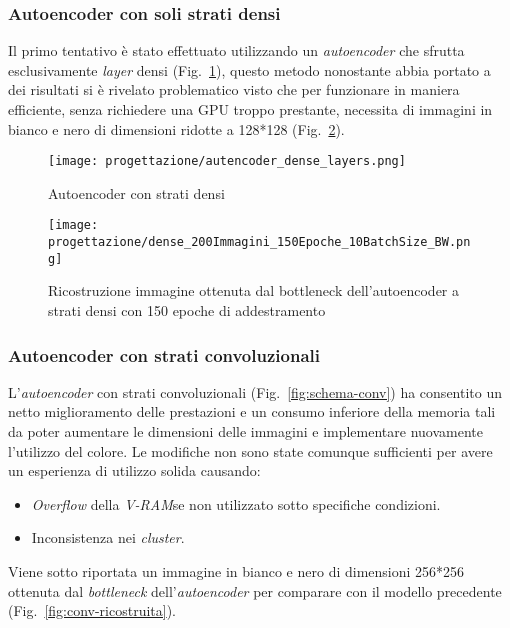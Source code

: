 \subsubsection{Autoencoder con soli strati densi}
Il primo tentativo è stato effettuato utilizzando un \emph{autoencoder} che sfrutta esclusivamente \emph{layer} densi (Fig.~\ref{fig:schema-denso}), questo metodo nonostante abbia portato a dei risultati si è rivelato problematico visto che per funzionare in maniera efficiente, senza richiedere una GPU troppo prestante, necessita di immagini in bianco e nero di dimensioni ridotte a 128*128 (Fig.~\ref{fig:dense-ricostruita}).

\begin{figure}[!h] 
  \centering 
  \texttt{[image: progettazione/autencoder\_dense\_layers.png]} 
  \caption{Autoencoder con strati densi}
  \label{fig:schema-denso}
\end{figure}


\begin{figure}[!h] 
  \centering 
  \texttt{[image: progettazione/dense\_200Immagini\_150Epoche\_10BatchSize\_BW.png]} 
  \caption{Ricostruzione immagine ottenuta dal bottleneck dell'autoencoder a strati densi con 150 epoche di addestramento}
  \label{fig:dense-ricostruita}
\end{figure}

\newpage

\subsubsection{Autoencoder con strati convoluzionali}
L'\emph{autoencoder} con strati convoluzionali (Fig.~\ref{fig:schema-conv}) ha consentito un netto miglioramento delle prestazioni e un consumo inferiore della memoria tali da poter aumentare le dimensioni delle immagini e implementare nuovamente l'utilizzo del colore.
Le modifiche non sono state comunque sufficienti per avere un esperienza di utilizzo solida causando:
\begin{itemize}
  \item \emph{Overflow} della \emph{\gls{V-RAM}}\glsfirstoccur se non utilizzato sotto specifiche condizioni.
  \item Inconsistenza nei \emph{cluster}.
\end{itemize}
Viene sotto riportata un immagine in bianco e nero di dimensioni 256*256 ottenuta dal \emph{bottleneck} dell'\emph{autoencoder} per comparare con il modello precedente (Fig.~\ref{fig:conv-ricostruita}).

